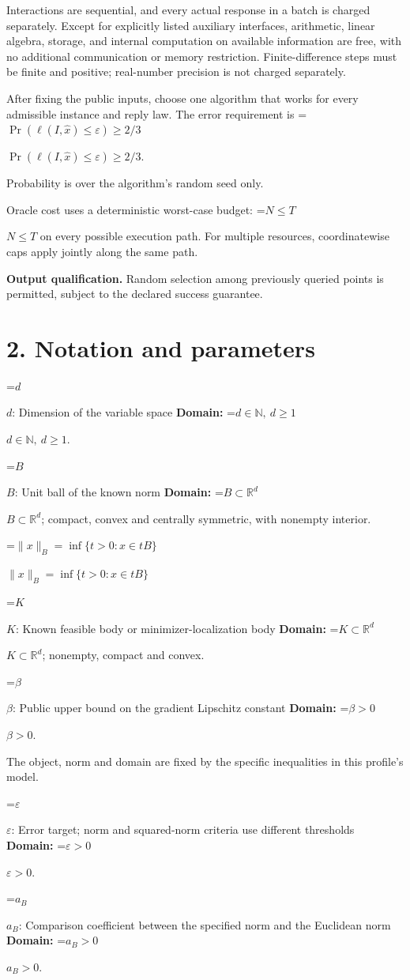 \documentclass[10pt,a4paper]{article}
\newcommand{\AtlasMath}[1]{\par\begingroup\centering\setbox0=\hbox{$\displaystyle #1$}\ifdim\wd0>1.4\linewidth\typeout{ATLAS WIDE FORMULA: \the\wd0}\fi\ifdim\wd0>\linewidth\resizebox{\linewidth}{!}{\box0}\else\box0\fi\par\endgroup}
\newcommand{\AtlasInlineMath}[1]{\begingroup\setbox0=\hbox{$#1$}\ifdim\wd0>.4\linewidth\endgroup\AtlasMath{#1}\else\endgroup$#1$\fi}
\begin{document}
Interactions are sequential, and every actual response in a batch is charged separately. Except for explicitly listed auxiliary interfaces, arithmetic, linear algebra, storage, and internal computation on available information are free, with no additional communication or memory restriction. Finite-difference steps must be finite and positive; real-number precision is not charged separately.

After fixing the public inputs, choose one algorithm that works for every admissible instance and reply law. The error requirement is \AtlasInlineMath{\Pr(\ell(I,\widehat{x})\le \varepsilon)\ge2/3}.

Probability is over the algorithm's random seed only.

Oracle cost uses a deterministic worst-case budget: \AtlasInlineMath{N\le T} on every possible execution path. For multiple resources, coordinatewise caps apply jointly along the same path.

\textbf{Output qualification.} Random selection among previously queried points is permitted, subject to the declared success guarantee.

\section{2. Notation and parameters}
\AtlasInlineMath{d}: Dimension of the variable space \textbf{Domain:} \AtlasInlineMath{d\in\mathbb{N},\ d\ge1}.

\AtlasInlineMath{B}: Unit ball of the known norm \textbf{Domain:} \AtlasInlineMath{B\subset\mathbb{R}^d}; compact, convex and centrally symmetric, with nonempty interior.

\AtlasInlineMath{\|x\|_B=\inf\{t>0:x\in tB\}}

\AtlasInlineMath{K}: Known feasible body or minimizer-localization body \textbf{Domain:} \AtlasInlineMath{K\subset\mathbb{R}^d}; nonempty, compact and convex.

\AtlasInlineMath{\beta}: Public upper bound on the gradient Lipschitz constant \textbf{Domain:} \AtlasInlineMath{\beta>0}.

The object, norm and domain are fixed by the specific inequalities in this profile's model.

\AtlasInlineMath{\varepsilon}: Error target; norm and squared-norm criteria use different thresholds \textbf{Domain:} \AtlasInlineMath{\varepsilon>0}.

\AtlasInlineMath{a_B}: Comparison coefficient between the specified norm and the Euclidean norm \textbf{Domain:} \AtlasInlineMath{a_B>0}.
\end{document}
